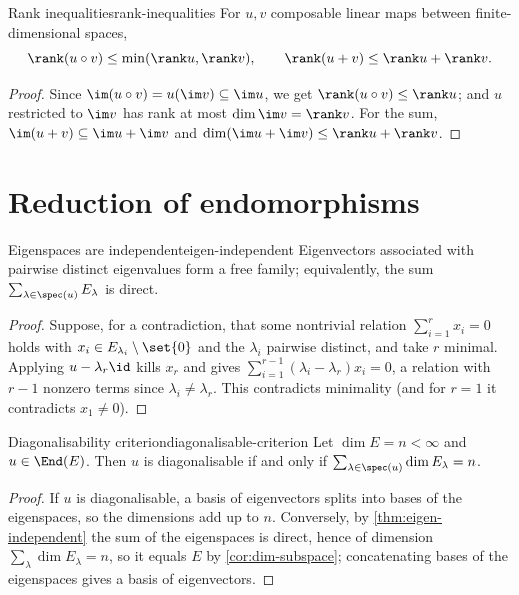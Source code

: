 \begin{proposition}{Rank inequalities}{rank-inequalities}
For $u,v$ composable linear maps between finite-dimensional spaces,
\[
  \rank(u\circ v)\leq\min(\rank u,\rank v),\qquad
  \rank(u+v)\leq\rank u+\rank v .
\]
\end{proposition}

\begin{proof}
Since $\im(u\circ v)=u(\im v)\subseteq\im u$, we get $\rank(u\circ v)\leq\rank u$;
and $u$ restricted to $\im v$ has rank at most $\dim\im v=\rank v$. For the sum,
$\im(u+v)\subseteq\im u+\im v$ and $\dim(\im u+\im v)\leq\rank u+\rank v$.
\end{proof}

\section{Reduction of endomorphisms}

\begin{theorem}{Eigenspaces are independent}{eigen-independent}
Eigenvectors associated with pairwise distinct eigenvalues form a free family;
equivalently, the sum $\sum_{\lambda\in\spec(u)}E_\lambda$ is direct.
\end{theorem}

\begin{proof}
Suppose, for a contradiction, that some nontrivial relation
$\sum_{i=1}^{r}x_i=0$ holds with $x_i\in E_{\lambda_i}\setminus\set{0}$ and the
$\lambda_i$ pairwise distinct, and take $r$ minimal. Applying $u-\lambda_r\id$
kills $x_r$ and gives $\sum_{i=1}^{r-1}(\lambda_i-\lambda_r)x_i=0$, a relation
with $r-1$ nonzero terms since $\lambda_i\neq\lambda_r$. This contradicts
minimality (and for $r=1$ it contradicts $x_1\neq0$).
\end{proof}

\begin{theorem}{Diagonalisability criterion}{diagonalisable-criterion}
Let $\dim E=n<\infty$ and $u\in\End(E)$. Then $u$ is diagonalisable if and only
if $\sum_{\lambda\in\spec(u)}\dim E_\lambda=n$.
\end{theorem}

\begin{proof}
If $u$ is diagonalisable, a basis of eigenvectors splits into bases of the
eigenspaces, so the dimensions add up to $n$. Conversely, by
\cref{thm:eigen-independent} the sum of the eigenspaces is direct, hence of
dimension $\sum_\lambda\dim E_\lambda=n$, so it equals $E$ by
\cref{cor:dim-subspace}; concatenating bases of the eigenspaces gives a basis of
eigenvectors.
\end{proof}

